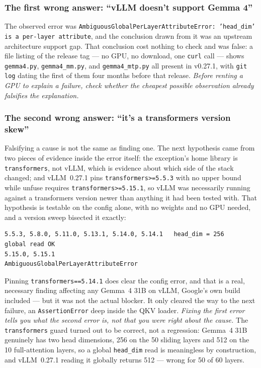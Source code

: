 \documentclass[11pt]{article}
\begin{document}
\subsubsection*{The first wrong answer: ``vLLM doesn't support Gemma 4''}
The observed error was \texttt{AmbiguousGlobalPerLayerAttributeError: 'head\_dim' is a
per-layer attribute}, and the conclusion drawn from it was an upstream architecture
support gap. That conclusion cost nothing to check and was false: a file listing of the
release tag --- no GPU, no download, one \texttt{curl} call --- shows \texttt{gemma4.py},
\texttt{gemma4\_mm.py}, and \texttt{gemma4\_mtp.py} all present in v0.27.1, with
\texttt{git log} dating the first of them four months before that release. \emph{Before
renting a GPU to explain a failure, check whether the cheapest possible observation
already falsifies the explanation.}

\subsubsection*{The second wrong answer: ``it's a transformers version skew''}
Falsifying a cause is not the same as finding one. The next hypothesis came from two
pieces of evidence inside the error itself: the exception's home library is
\texttt{transformers}, not vLLM, which is evidence about which side of the stack
changed; and vLLM~0.27.1 pins \texttt{transformers>=5.5.3} with no upper bound while
unfuse requires \texttt{transformers>=5.15.1}, so vLLM was necessarily running against a
transformers version newer than anything it had been tested with. That hypothesis is
testable on the config alone, with no weights and no GPU needed, and a version sweep
bisected it exactly:

\begin{lstlisting}
5.5.3, 5.8.0, 5.11.0, 5.13.1, 5.14.0, 5.14.1   head_dim = 256    global read OK
5.15.0, 5.15.1                                 AmbiguousGlobalPerLayerAttributeError
\end{lstlisting}

Pinning \texttt{transformers==5.14.1} does clear the config error, and that is a real,
necessary finding affecting any Gemma~4 31B on vLLM, Google's own build included --- but
it was not the actual blocker. It only cleared the way to the next failure, an
\texttt{AssertionError} deep inside the QKV loader. \emph{Fixing the first error tells
you what the second error is, not that you were right about the cause.} The
\texttt{transformers} guard turned out to be correct, not a regression: Gemma~4 31B
genuinely has two head dimensions, 256 on the 50 sliding layers and 512 on the 10
full-attention layers, so a global \texttt{head\_dim} read is meaningless by
construction, and vLLM~0.27.1 reading it globally returns 512 --- wrong for 50 of 60
layers.
\end{document}
